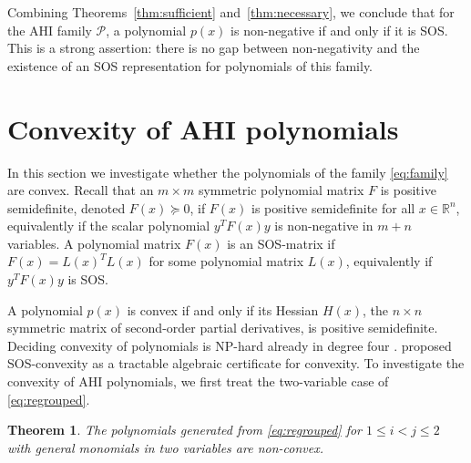 \documentclass[12pt]{elsarticle}
\newtheorem{theorem}{Theorem}[section]
\theoremstyle{definition}
\begin{document}
Combining Theorems~\ref{thm:sufficient} and~\ref{thm:necessary}, we conclude that for the AHI family $\mathcal{P}$, a polynomial $p(x)$ is non-negative if and only if it is SOS. This is a strong assertion: there is no gap between non-negativity and the existence of an SOS representation for polynomials of this family.

\section{Convexity of AHI polynomials}\label{sec:convexity}

In this section we investigate whether the polynomials of the family \eqref{eq:family} are convex. Recall that an $m\times m$ symmetric polynomial matrix $F$ is positive semidefinite, denoted $F(x)\succeq 0$, if $F(x)$ is positive semidefinite for all $x\in \mathbb{R}^n$, equivalently if the scalar polynomial $y^T F(x) y$ is non-negative in $m+n$ variables. A polynomial matrix $F(x)$ is an SOS-matrix if $F(x)=L(x)^T L(x)$ for some polynomial matrix $L(x)$, equivalently if $y^TF(x)y$ is SOS.

A polynomial $p(x)$ is convex if and only if its Hessian $H(x)$, the $n\times n$ symmetric matrix of second-order partial derivatives, is positive semidefinite. Deciding convexity of polynomials is NP-hard already in degree four \citep{ahmadi2013np}. \citet{helton2010semidefinite} proposed SOS-convexity as a tractable algebraic certificate for convexity. To investigate the convexity of AHI polynomials, we first treat the two-variable case of \eqref{eq:regrouped}.

\begin{theorem}\label{thm:nonconvex-2var}
The polynomials generated from \eqref{eq:regrouped} for $1\leq i < j\leq 2$ with general monomials in two variables are non-convex.
\end{theorem}
\end{document}
